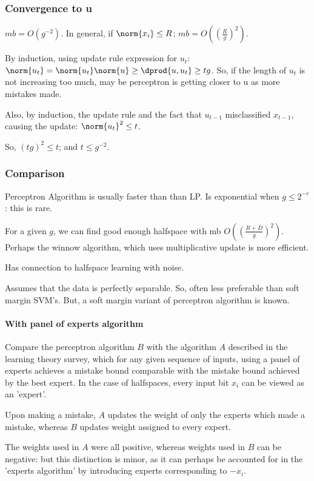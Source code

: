 \documentclass[oneside, article]{memoir}
\begin{document}
\subsubsection{Convergence to u}
$mb = O(g^{-2})$. In general, if $\norm{x_i} \leq R$; $mb = O((\frac{R}{g})^{2})$.

By induction, using update rule expression for $u_t$: $\norm{u_t} = \norm{u_t}\norm{u} \geq \dprod{u, u_t} \geq tg$. So, if the length of $u_t$ is not increasing too much, may be perceptron is getting closer to u as more mistakes made.

Also, by induction, the update rule and the fact that $u_{t-1}$ misclassified $x_{t-1}$, causing the update: $\norm{u_{t}}^{2} \leq t$.

So, $(tg)^{2} \leq t$; and $t\leq g^{-2}$.

\subsubsection{Comparison}
Perceptron Algorithm is usually faster than than LP. Is exponential when $g \leq 2^{-c}$: this is rare.

For a given $g$, we can find good enough halfspace with mb $O((\frac{R+D}{g})^{2})$. \chk Perhaps the winnow algorithm, which uses multiplicative update is more efficient.

Has connection to halfspace learning with noise. \why

Assumes that the data is perfectly separable. So, often less preferable than soft margin SVM's. But, a soft margin variant of perceptron algorithm is known.

\paragraph*{With panel of experts algorithm}
Compare the perceptron algorithm $B$ with the algorithm $A$ described in the learning theory survey, which for any given sequence of inputs, using a panel of experts achieves a mistake bound comparable with the mistake bound achieved by the best expert. In the case of halfspaces, every input bit $x_i$ can be viewed as an 'expert'.

Upon making a mistake, $A$ updates the weight of only the experts which made a mistake, whereas $B$ updates weight assigned to every expert.

The weights used in $A$ were all positive, whereas weights used in $B$ can be negative: but this distinction is minor, as it can perhaps be accounted for in the 'experts algorithm' by introducing experts corresponding to $-x_i$.
\end{document}
